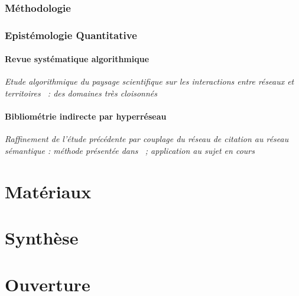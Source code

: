 \section{Méthodologie}









\section{Epistémologie Quantitative}

\subsection{Revue systématique algorithmique}

\textit{Etude algorithmique du paysage scientifique sur les interactions entre réseaux et territoires~\cite{raimbault2015models} : des domaines très cloisonnés}


\subsection{Bibliométrie indirecte par hyperréseau}


\textit{Raffinement de l'étude précédente par couplage du réseau de citation au réseau sémantique : méthode présentée dans~\cite{raimbault2016indirect} ; application au sujet en cours} 

\part{Matériaux}





\part{Synthèse}




\part{Ouverture}






